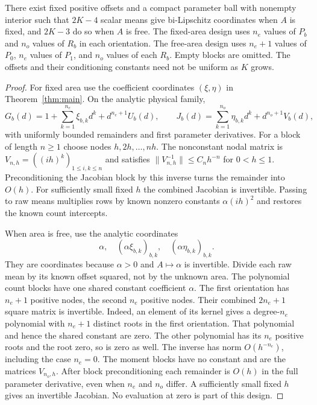 \begin{proposition}\label{prop:windows}
There exist fixed positive offsets and a compact parameter ball with
nonempty interior such that $2K-4$ scalar means give bi-Lipschitz
coordinates when $A$ is fixed, and $2K-3$ do so when $A$ is free.
The fixed-area design uses $n_e$ values of $P_b$ and $n_o$ values
of $R_b$ in each orientation. The free-area design uses $n_e+1$
values of $P_0$, $n_e$ values of $P_1$, and $n_o$ values of each
$R_b$. Empty blocks are omitted. The offsets and their conditioning
constants need not be uniform as $K$ grows.
\end{proposition}
\begin{proof}
For fixed area use the coefficient coordinates $(\xi,\eta)$ in
Theorem~\ref{thm:main}. On the analytic physical family,
\[
 G_b(d)=1+\sum_{k=1}^{n_e}\xi_{b,k}d^k
                   +d^{n_e+1}U_b(d),\qquad
 J_b(d)=\sum_{k=1}^{n_o}\eta_{b,k}d^k
                   +d^{n_o+1}V_b(d),
\]
with uniformly bounded remainders and first parameter derivatives.
For a block of length $n\ge1$ choose nodes $h,2h,\ldots,nh$.
The nonconstant nodal matrix is
$V_{n,h}=((ih)^k)_{1\le i,k\le n}$ and satisfies
$\|V_{n,h}^{-1}\|\le C_nh^{-n}$ for $0<h\le1$.
Preconditioning the Jacobian block by this inverse turns the remainder
into $O(h)$. For sufficiently small fixed $h$ the combined Jacobian
is invertible. Passing to raw means multiplies rows by known nonzero
constants $\alpha(ih)^2$ and restores the known count intercepts.

When area is free, use the analytic coordinates
\begin{equation}\label{eq:scaledcoordinates}
 \alpha,\quad (\alpha\xi_{b,k})_{b,k},\quad
                      (\alpha\eta_{b,k})_{b,k}.
\end{equation}
They are coordinates because $\alpha>0$ and $A\mapsto\alpha$
is invertible. Divide each raw mean by its known offset squared,
not by the unknown area. The polynomial count blocks have one shared
constant coefficient $\alpha$. The first orientation has $n_e+1$
positive nodes, the second $n_e$ positive nodes. Their combined
$2n_e+1$ square matrix is invertible. Indeed, an element of its kernel
gives a degree-$n_e$ polynomial with $n_e+1$ distinct roots in the
first orientation. That polynomial and hence the shared constant are
zero. The other polynomial has its $n_e$ positive roots and the root
zero, so is zero as well. The inverse has norm $O(h^{-n_e})$,
including the case $n_e=0$. The moment blocks have no constant and
are the matrices $V_{n_o,h}$. After block preconditioning each
remainder is $O(h)$ in the full parameter derivative, even when
$n_e$ and $n_o$ differ. A sufficiently small fixed $h$ gives an
invertible Jacobian. No evaluation at zero is part of this design.


\end{proof}
